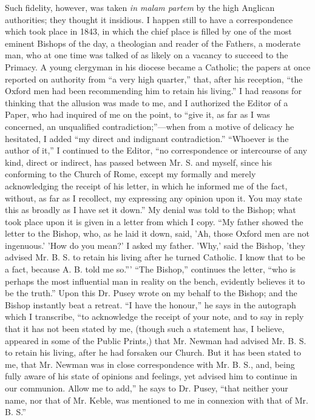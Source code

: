 Such fidelity, however, was taken \emph{in malam partem} by the high
Anglican authorities; they thought it insidious. I happen still to have
a correspondence which took place in 1843, in which the chief
place is filled by one of the most eminent Bishops of the day, a
theologian and reader of the Fathers, a moderate man, who at one time
was talked of as likely on a vacancy to succeed to the Primacy.
A young clergyman in his diocese became a Catholic; the papers at once
reported on authority from ``a very high quarter,'' that, after
his reception, ``the Oxford men had been recommending him to retain
his living.'' I had reasons for thinking that the allusion was made to me, and I authorized the Editor of a Paper, who had
inquired of me on the point, to ``give it, as far as I was
concerned, an unqualified contradiction;''—when from a motive of
delicacy he hesitated, I added ``my direct and indignant
contradiction.'' ``Whoever is the author of it,'' I
continued to the Editor, ``no correspondence or intercourse of
any kind, direct or indirect, has passed between Mr. S. and myself, since his conforming to the
Church of Rome, except my formally and merely acknowledging the receipt
of his letter, in which he informed me of the fact, without, as
far as I recollect, my expressing any opinion upon it. You may state
this as broadly as I have set it down.'' My denial was told to the
Bishop; what took place upon it is given in a letter from which I copy.
``My father showed the letter to the Bishop, who, as he laid it
down, said, 'Ah, those Oxford men are not ingenuous.' 'How do you mean?'
I asked my father. 'Why,' said the Bishop, 'they advised Mr. B. S. to
retain his living after he turned Catholic. I know that to be a fact,
because A. B. told me so.''' ``The Bishop,'' continues the
letter, ``who is perhaps the most influential man in reality on the
bench, evidently believes it to be the truth.'' Upon this
Dr. Pusey wrote on my behalf to the Bishop; and the Bishop
instantly beat a retreat. ``I have the honour,'' he says in the
autograph which I transcribe, ``to acknowledge the receipt of your
note, and to say in reply that it has not been stated by me, (though
such a statement has, I believe, appeared in some of the Public Prints,)
that Mr. Newman had advised Mr. B. S. to retain his living, after he had
forsaken our Church. But it has been stated to me, that Mr. Newman was
in close correspondence with Mr. B. S., and, being fully aware of his
state of opinions and feelings, yet advised him to continue in our
communion. Allow me to add,'' he says to Dr. Pusey, ``that neither
your name, nor that of Mr. Keble, was mentioned to me in connexion with
that of Mr. B. S.''


